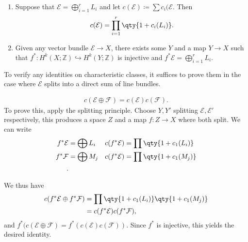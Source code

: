 \begin{theorem}

\envlist

\begin{enumerate}
\def\labelenumi{\arabic{enumi}.}
\item
  Suppose that \(\mathcal{E} = \bigoplus_{i=1}^r L_i\) and let
  \(c(\mathcal{E}) \coloneqq\sum c_i(\mathcal{E}\). Then
  \begin{align*}
    c(\mathcal{E}) = \prod_{i=1}^r \qty{ 1 + c_i (L_i) }
    .\end{align*}
\item
  Given any vector bundle \(\mathcal{E} \to X\), there exists some \(Y\)
  and a map \(Y\to X\) such that
  \(f^*: H^k(X; {\mathbb{Z}}) \hookrightarrow H^k(Y; {\mathbb{Z}})\) is
  injective and \(f^* \mathcal{E} = \bigoplus_{i=1}^r L_i\).
\end{enumerate}

\end{theorem}

\begin{slogan}

To verify any identities on characteristic classes, it suffices to prove
them in the case where \(\mathcal{E}\) splits into a direct sum of line
bundles.

\end{slogan}

\begin{example}[?]

\begin{align*}
c( \mathcal{E} \oplus \mathcal{F}) = c( \mathcal{E} ) c( \mathcal{F} )
.\end{align*}
To prove this, apply the splitting principle. Choose \(Y, Y'\) splitting
\(\mathcal{E}, \mathcal{E}'\) respectively, this produces a space \(Z\)
and a map \(f:Z\to X\) where both split. We can write
\begin{align*}
f^* \mathcal{E} &= \bigoplus L_i 
&& c(f^* \mathcal{E} ) = \prod \qty{ 1 + c_1(L_i) } \\
f^* \mathcal{F} &= \bigoplus M_j 
&& c(f^* \mathcal{E} ) = \prod \qty{ 1 + c_1(M_j) } \\
.\end{align*}

We thus have
\begin{align*}
c( f^* \mathcal{E} \oplus f^* \mathcal{F} ) 
&= \prod \qty{1 + c_1(L_i) } \qty{1 + c_1(M_j)} \\
&= c(f^* \mathcal{E} ) c(f^* \mathcal{F} )
,\end{align*}
and
\(f^* (c( \mathcal{E} \oplus \mathcal{F} ) = f^* (c (\mathcal{E}) c( \mathcal{F}))\).
Since \(f^*\) is injective, this yields the desired identity.

\end{example}

